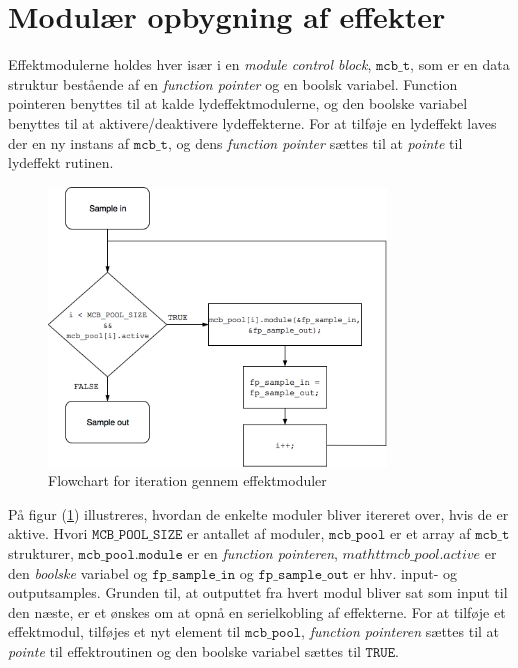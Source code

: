\section{Modulær opbygning af effekter}
Effektmodulerne holdes hver især i en \textit{module control block}, $\mathtt{mcb\_t}$,  som er en data struktur bestående af en \textit{function pointer} og en boolsk variabel.
Function pointeren benyttes til at kalde lydeffektmodulerne, og den boolske variabel benyttes til at aktivere/deaktivere lydeffekterne.\newline
For at tilføje en lydeffekt laves der en ny instans af $\mathtt{mcb\_t}$, og dens \textit{function pointer} sættes til at \textit{pointe} til lydeffekt rutinen.\newline
\begin{figure}[!ht]
	\centering
	\includegraphics[width=0.8\textwidth]{billeder/Flowchart_for_effektmoduler.png}
	\caption{Flowchart for iteration gennem effektmoduler}
	\label{fig:effektmoduler}
\end{figure}

På figur (\ref{fig:effektmoduler}) illustreres, hvordan de enkelte moduler bliver itereret over, hvis de er aktive.
Hvori $\mathtt{MCB\_POOL\_SIZE}$ er antallet af moduler, $\mathtt{mcb\_pool}$ er et array af $\mathtt{mcb\_t}$ strukturer, $\mathtt{mcb\_pool.module}$ er en \textit{function pointeren}, $mathtt{mcb\_pool.active}$ er den \textit{boolske} variabel og $\mathtt{fp\_sample\_in}$ og $\mathtt{fp\_sample\_out}$ er hhv. input- og outputsamples.
Grunden til, at outputtet fra hvert modul bliver sat som input til den næste, er et ønskes om at opnå en serielkobling af effekterne.
For at tilføje et effektmodul, tilføjes et nyt element til $\mathtt{mcb\_pool}$, \textit{function pointeren} sættes til at \textit{pointe} til effektroutinen og den boolske variabel sættes til $\mathtt{TRUE}$.

